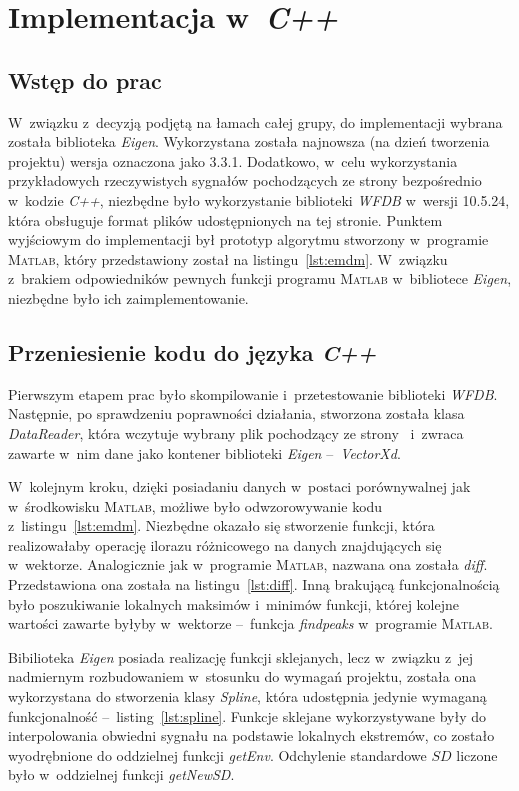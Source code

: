 \section{Implementacja w~\textit{C++}}

\subsection{Wstęp do prac}
\indent

W~związku z~decyzją podjętą na łamach całej grupy, do implementacji wybrana
została biblioteka \textit{Eigen}. Wykorzystana została najnowsza (na dzień
tworzenia projektu) wersja oznaczona jako 3.3.1. Dodatkowo, w~celu wykorzystania
przykładowych rzeczywistych sygnałów pochodzących ze strony \cite{EKG-DB}
bezpośrednio w~kodzie \textit{C++}, niezbędne było wykorzystanie biblioteki
\textit{WFDB} w~wersji 10.5.24, która obsługuje format plików udostępnionych na
tej stronie. Punktem wyjściowym do implementacji był prototyp algorytmu
stworzony w~programie \textsc{Matlab}, który przedstawiony został na
listingu~\ref{lst:emdm}. W~związku z~brakiem odpowiedników pewnych funkcji
programu \textsc{Matlab} w~bibliotece \textit{Eigen}, niezbędne było ich
zaimplementowanie.

\subsection{Przeniesienie kodu do języka \textit{C++}}
\indent

Pierwszym etapem prac było skompilowanie i~przetestowanie biblioteki
\textit{WFDB}. Następnie, po sprawdzeniu poprawności działania, stworzona
została klasa \textit{DataReader}, która wczytuje wybrany plik pochodzący ze
strony~\cite{EKG-DB} i~zwraca zawarte w~nim dane jako kontener biblioteki
\textit{Eigen} --~\textit{VectorXd}.

W~kolejnym kroku, dzięki posiadaniu danych w~postaci porównywalnej jak
w~środkowisku \textsc{Matlab}, możliwe było odwzorowywanie kodu
z~listingu~\ref{lst:emdm}. Niezbędne okazało się stworzenie funkcji, która
realizowałaby operację ilorazu różnicowego na danych znajdujących się
w~wektorze. Analogicznie jak w~programie \textsc{Matlab}, nazwana ona została
\textit{diff}. Przedstawiona ona została na listingu~\ref{lst:diff}. Inną
brakującą funkcjonalnością było poszukiwanie lokalnych maksimów i~minimów
funkcji, której kolejne wartości zawarte byłyby w~wektorze --~funkcja
\textit{findpeaks} w~programie \textsc{Matlab}.

Bibilioteka \textit{Eigen} posiada realizację funkcji sklejanych, lecz w~związku
z~jej nadmiernym rozbudowaniem w~stosunku do wymagań projektu, została ona
wykorzystana do stworzenia klasy \textit{Spline}, która udostępnia jedynie
wymaganą funkcjonalność --~listing~\ref{lst:spline}. Funkcje sklejane
wykorzystywane były do interpolowania obwiedni sygnału na podstawie lokalnych
ekstremów, co zostało wyodrębnione do oddzielnej funkcji \textit{getEnv}.
Odchylenie standardowe $SD$ liczone było w~oddzielnej funkcji \textit{getNewSD}.

